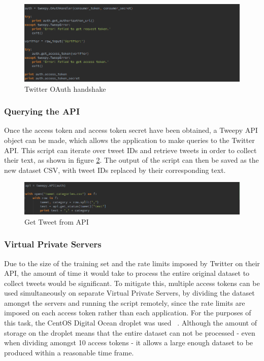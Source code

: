 \begin{figure}[H]
    \centering
    \includegraphics[width=\textwidth]{Images/Implementation/oauth}
    \caption{Twitter OAuth handshake} \label{fig:oauth}
\end{figure}

\subsubsection{Querying the API}
Once the access token and access token secret have been obtained, a Tweepy API object can be made, which allows the application to make queries to the Twitter API. This script can iterate over tweet IDs and retrieve tweets in order to collect their text, as shown in figure \ref{fig:get-tweets}. The output of the script can then be saved as the new dataset CSV, with tweet IDs replaced by their corresponding text.

\begin{figure}[H]
    \centering
    \includegraphics[width=\textwidth]{Images/Implementation/get-tweets}
    \caption{Get Tweet from API} \label{fig:get-tweets}
\end{figure}

\subsubsection{Virtual Private Servers}
Due to the size of the training set and the rate limits imposed by Twitter on their API, the amount of time it would take to process the entire original dataset to collect tweets would be significant. To mitigate this, multiple access tokens can be used simultaneously on separate Virtual Private Servers, by dividing the dataset amongst the servers and running the script remotely, since the rate limits are imposed on each access token rather than each application. For the purposes of this task, the CentOS Digital Ocean droplet was used ~\cite{DigitalOcean:Home}. Although the amount of storage on the droplet means that the entire dataset can not be processed - even when dividing amongst 10 access tokens - it allows a large enough dataset to be produced within a reasonable time frame.


